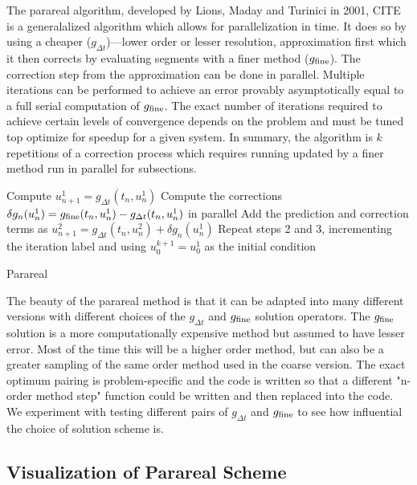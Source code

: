 \documentclass[letterpaper,12pt]{article}
\begin{document}
The parareal algorithm, developed by Lions, Maday and Turinici in 2001, CITE is
a generalalized algorithm which allows for parallelization in time. It does so by using a
cheaper ($g_{\Delta t}$)---lower order or lesser resolution, approximation first which it then corrects by evaluating segments with a finer method ($g_{\textnormal{fine}}$). The correction step from the approximation can be done in parallel. Multiple iterations can be performed to achieve an error provably asymptotically equal to a full serial computation of $g_{\textnormal{fine}}$. The exact number of iterations required to achieve certain levels of convergence depends on the problem and must be tuned top optimize for speedup for a given system. In summary, the algorithm is $k$ repetitions of a
correction process which requires running updated by a finer method run in parallel for subsections.

\begin{algorithm}[t]
    Compute $u^1_{n+1} = g_{\Delta t}(t_n, u^1_n)$\;
    Compute the corrections $\delta g_n(u^1_n) = g_{\textnormal{fine}}(t_n,
    u^1_n) - g_{\Delta t}(t_n, u^1_n)$ in parallel\;
    Add the prediction and correction terms as $u^2_{n+1} = g_{\Delta t}(t_n,
    u^2_n) + \delta g_n(u^1_n)$\;
    Repeat steps 2 and 3, incrementing the iteration label and using $u^{k+1}_0
    = u^1_0$ as the initial condition\;
 \caption{Parareal}
 \label{alg:parareal}
\end{algorithm}

The beauty of the parareal method is that it can be adapted into many different versions with different choices of the $g_{\Delta t}$ and $g_{\textnormal{fine}}$ solution operators. The $g_{\textnormal{fine}}$ solution is a more computationally expensive method but assumed to have lesser error.  Most of the time this will be a higher order method, but can also be a greater sampling of the same order method used in the coarse version.  The exact optimum pairing is problem-specific and the code is written so that a different "n-order method step" function could be written and then replaced into the code. We experiment with testing different pairs of $g_{\Delta t}$ and $g_{\textnormal{fine}}$ to see how influential the choice of solution scheme is.

\subsection{Visualization of Parareal Scheme}
\end{document}
